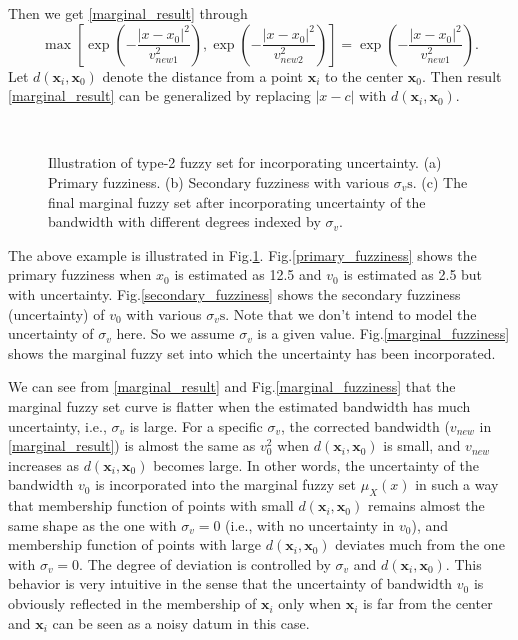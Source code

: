 \documentclass[journal,transmag]{IEEEtran}
\begin{document}
Then we get \eqref{marginal_result} through
\begin{equation*}
\max\left[\exp\left(-\frac{|x-x_0|^2}{v_{new1}^2}\right),\exp\left(-\frac{|x-x_0|^2}{v_{new2}^2}\right)\right]=\exp\left(-\frac{|x-x_0|^2}{v_{new1}^2}\right).
\end{equation*}
Let $d(\mathbf{x}_i,\mathbf{x}_0)$ denote the distance from a point $\mathbf{x}_i$ to the center $\mathbf{x}_0$. Then result \eqref{marginal_result} can be generalized by replacing $|x-c|$ with $d(\mathbf{x}_i,\mathbf{x}_0)$.
\begin{figure}[!t]
   \centering
   \\
  \caption{Illustration  of type-2 fuzzy set for incorporating uncertainty. (a) Primary fuzziness. (b) Secondary fuzziness with various $\sigma_v\text{s}$. (c) The final marginal fuzzy set after incorporating  uncertainty of the bandwidth with different degrees indexed by $\sigma_v$.}
\label{type2_fs_uncertainty}
\end{figure}

The above example is illustrated in Fig.\ref{type2_fs_uncertainty}. Fig.\ref{primary_fuzziness} shows the primary fuzziness when $x_0$ is estimated as 12.5 and $v_0$ is estimated as 2.5 but with uncertainty. Fig.\ref{secondary_fuzziness} shows the secondary fuzziness (uncertainty) of $v_0$ with various $\sigma_v\text{s}$. Note that we don't intend to model the uncertainty of $\sigma_v$ here. So we assume $\sigma_v$ is a given value. Fig.\ref{marginal_fuzziness} shows the marginal fuzzy set into which the uncertainty has been incorporated.

We can see from \eqref{marginal_result} and Fig.\ref{marginal_fuzziness} that the marginal fuzzy set curve is flatter when the estimated bandwidth has much uncertainty, i.e., $\sigma_v$ is large.
For a specific $\sigma_v$, the corrected bandwidth ($v_{new}$ in \eqref{marginal_result}) is almost the same as $v_0^2$ when $d(\mathbf{x}_i,\mathbf{x}_0)$ is small, and $v_{new}$ increases as $d(\mathbf{x}_i,\mathbf{x}_0)$ becomes large.
In other words, the uncertainty of the bandwidth $v_0$ is incorporated into the marginal fuzzy set $\mu_X(x)$ in such a way that membership function of points with small $d(\mathbf{x}_i,\mathbf{x}_0)$ remains almost the same shape as the one with $\sigma_v=0$ (i.e., with no uncertainty in $v_0$), and membership function of points with large $d(\mathbf{x}_i,\mathbf{x}_0)$ deviates much from the one with $\sigma_v=0$. The degree of deviation is controlled by $\sigma_v$ and $d(\mathbf{x}_i,\mathbf{x}_0)$. This behavior is very intuitive in the sense that the uncertainty of bandwidth $v_0$ is obviously reflected in the membership of $\mathbf{x}_i$ only when $\mathbf{x}_i$ is far from the center and $\mathbf{x}_i$ can be seen as a noisy datum in this case.
\end{document}
